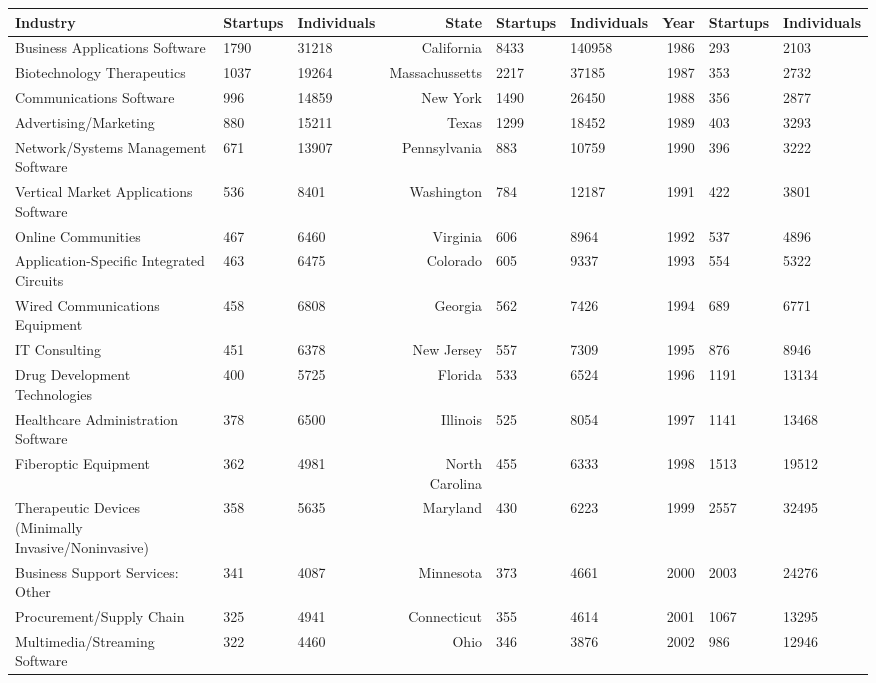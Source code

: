 \begin{table}[!htb]
\centering
\begingroup\scriptsize
\begin{tabular}{p{4.5cm}llrllrll}
  \toprule
Industry & Startups & Individuals & State & Startups & Individuals & Year & Startups & Individuals \\ 
  \midrule
Business Applications Software & 1790 & 31218 & California & 8433 & 140958 & 1986 & 293 & 2103 \\ 
  Biotechnology Therapeutics & 1037 & 19264 & Massachussetts & 2217 & 37185 & 1987 & 353 & 2732 \\ 
  Communications Software & 996 & 14859 & New York & 1490 & 26450 & 1988 & 356 & 2877 \\ 
  Advertising/Marketing & 880 & 15211 & Texas & 1299 & 18452 & 1989 & 403 & 3293 \\ 
  Network/Systems Management Software & 671 & 13907 & Pennsylvania & 883 & 10759 & 1990 & 396 & 3222 \\ 
  Vertical Market Applications Software & 536 & 8401 & Washington & 784 & 12187 & 1991 & 422 & 3801 \\ 
  Online Communities & 467 & 6460 & Virginia & 606 & 8964 & 1992 & 537 & 4896 \\ 
  Application-Specific Integrated Circuits & 463 & 6475 & Colorado & 605 & 9337 & 1993 & 554 & 5322 \\ 
  Wired Communications Equipment & 458 & 6808 & Georgia & 562 & 7426 & 1994 & 689 & 6771 \\ 
  IT Consulting & 451 & 6378 & New Jersey & 557 & 7309 & 1995 & 876 & 8946 \\ 
  Drug Development Technologies & 400 & 5725 & Florida & 533 & 6524 & 1996 & 1191 & 13134 \\ 
  Healthcare Administration Software & 378 & 6500 & Illinois & 525 & 8054 & 1997 & 1141 & 13468 \\ 
  Fiberoptic Equipment & 362 & 4981 & North Carolina & 455 & 6333 & 1998 & 1513 & 19512 \\ 
  Therapeutic Devices (Minimally Invasive/Noninvasive) & 358 & 5635 & Maryland & 430 & 6223 & 1999 & 2557 & 32495 \\ 
  Business Support Services: Other & 341 & 4087 & Minnesota & 373 & 4661 & 2000 & 2003 & 24276 \\ 
  Procurement/Supply Chain & 325 & 4941 & Connecticut & 355 & 4614 & 2001 & 1067 & 13295 \\ 
  Multimedia/Streaming Software & 322 & 4460 & Ohio & 346 & 3876 & 2002 & 986 & 12946 \\ 

\end{tabular}
\end{table}
